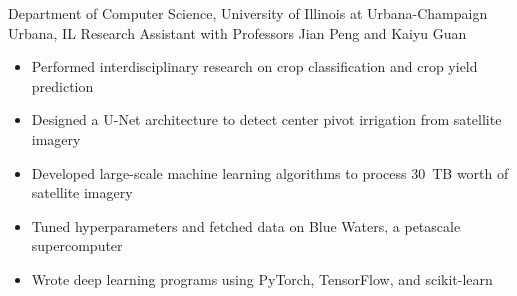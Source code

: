 
        {Department of Computer Science, University of Illinois at Urbana-Champaign}
        {Urbana, IL}
        {Research Assistant}
        {with Professors Jian Peng and Kaiyu Guan}{
    \begin{itemize}
        \item Performed interdisciplinary research on crop classification and crop yield prediction
        \item Designed a U-Net architecture to detect center pivot irrigation from satellite imagery
        \item Developed large-scale machine learning algorithms to process 30~TB worth of satellite imagery
        \item Tuned hyperparameters and fetched data on Blue Waters, a petascale supercomputer
        \item Wrote deep learning programs using PyTorch, TensorFlow, and scikit-learn
    \end{itemize}
}
